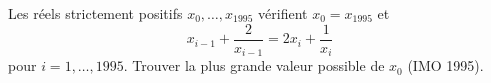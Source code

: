 Les réels strictement positifs $x_0, \ldots, x_{1995}$ vérifient $x_0 = x_{1995}$ et
\[ x_{i-1} + \frac{2}{x_{i-1}} = 2x_i + \frac{1}{x_i} \]
pour $i = 1, \ldots, 1995$. Trouver la plus grande valeur possible de $x_0$ (IMO 1995).
